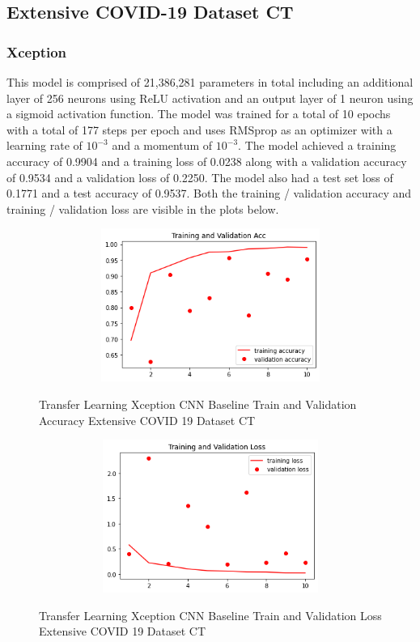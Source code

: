 \subsection{Extensive COVID-19 Dataset CT}
\subsubsection{Xception}
This model is comprised of 21,386,281 parameters in total including an additional layer of 256 neurons using ReLU activation and an output layer of 1 neuron using a sigmoid activation function.  The model was trained for a total of 10 epochs with a total of 177 steps per epoch and uses RMSprop as an optimizer with a learning rate of $10^{-3}$ and a momentum of $10^{-3}$.  The model achieved a training accuracy of 0.9904 and a training loss of 0.0238 along with a validation accuracy of 0.9534 and a validation loss of 0.2250.  The model also had a test set loss of 0.1771 and a test accuracy of 0.9537. Both the training / validation accuracy and training / validation loss are visible in the plots below.
 \begin{figure}[H]
    \centering
    \includegraphics[width=1\textwidth,height=5cm,keepaspectratio]{Images/XceptionBaselineTrainingValidationAccuracyExtensiveCT.png}\\
    \caption{Transfer Learning Xception CNN Baseline Train and Validation Accuracy Extensive COVID 19 Dataset CT}
    \label{fig:Xception CNN Baseline Train and Validation Accuracy Extensive COVID 19 Dataset CT}
\end{figure}
 \begin{figure}[H]
    \centering
    \includegraphics[width=1\textwidth,height=5cm,keepaspectratio]{Images/XceptionBaselineTrainingValidationLossExtensiveCT.png}\\
    \caption{Transfer Learning Xception CNN Baseline Train and Validation Loss Extensive COVID 19 Dataset CT}
    \label{fig:Xception CNN Baseline Train and Validation Loss Extensive COVID 19 Dataset CT}
\end{figure}
